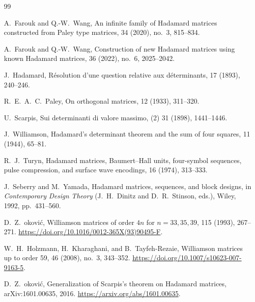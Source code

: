 \documentclass[11pt]{article}
\begin{document}
\begin{thebibliography}{99}

A.~Farouk and Q.-W.~Wang,
\newblock An infinite family of Hadamard matrices constructed from
  Paley type matrices,
 34 (2020), no.\ 3, 815--834.

A.~Farouk and Q.-W.~Wang,
\newblock Construction of new Hadamard matrices using known Hadamard
  matrices,
 36 (2022), no.\ 6, 2025--2042.

J.~Hadamard,
\newblock R\'esolution d'une question relative aux d\'eterminants,
 17 (1893), 240--246.

R.~E.~A.~C.~Paley,
\newblock On orthogonal matrices,
 12 (1933), 311--320.

U.~Scarpis,
\newblock Sui determinanti di valore massimo,
 (2) 31 (1898),
  1441--1446.

J.~Williamson,
\newblock Hadamard's determinant theorem and the sum of four squares,
 11 (1944), 65--81.

R.~J.~Turyn,
\newblock Hadamard matrices, Baumert--Hall units, four-symbol sequences,
  pulse compression, and surface wave encodings,
 16 (1974), 313--333.

J.~Seberry and M.~Yamada,
\newblock Hadamard matrices, sequences, and block designs,
\newblock in {\em Contemporary Design Theory} (J.~H.~Dinitz and
  D.~R.~Stinson, eds.), Wiley, 1992, pp.\ 431--560.

D.~Z.~\DJ okovi\'c,
\newblock Williamson matrices of order \(4n\) for \(n=33,35,39\),
 115 (1993), 267--271.
\newblock \url{https://doi.org/10.1016/0012-365X(93)90495-F}.

W.~H.~Holzmann, H.~Kharaghani, and B.~Tayfeh-Rezaie,
\newblock Williamson matrices up to order 59,
 46 (2008), no.\ 3, 343--352.
\newblock \url{https://doi.org/10.1007/s10623-007-9163-5}.

D.~Z.~\DJ okovi\'c,
\newblock Generalization of Scarpis's theorem on Hadamard matrices,
\newblock arXiv:1601.00635, 2016.
\newblock \url{https://arxiv.org/abs/1601.00635}.


\end{thebibliography}
\end{document}
